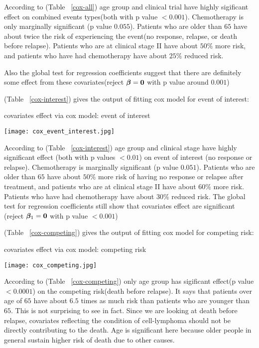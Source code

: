 \documentclass[times, doublespace]{simauth}
\begin{document}
According to (Table ~\ref{cox-all}) age group and clinical trial have highly sigificant effect on combined events types(both with p value $< 0.001$). Chemotherapy is only marginally significant (p value $0.055$). Patients who are older than $65$ have about twice the risk of experiencing the event(no response, relapse, or death before relapse). Patients who are at clinical stage II have about $50\%$ more risk, and patients who have had chemotherapy have about $25\%$ reduced risk. 

Also the global test for regression coefficients suggest that there are definitely some effect from these covariates(reject ${\bm \beta} = {\bf 0}$ with p value around $0.001$)

(Table ~\ref{cox-interest}) gives the output of fitting cox model for event of interest:
\begin{table}[!htb]
	\begin{center}
		\caption{covariates effect via cox model: event of interest}\label{cox-interest}
		\texttt{[image: cox\_event\_interest.jpg]}
	\end{center}
\end{table}

According to (Table ~\ref{cox-interest}) age group and clinical stage have highly significant effect (both with p values $<0.01 $) on event of interest (no response or relapse). Chemotherapy is marginally significant (p value $0.051$). Patients who are older than $65$ have about $50\%$ more risk of having no response or relapse after treatment, and patients who are at clinical stage II have about $60\%$ more risk. Patients who have had chemotherapy have about $30\%$ reduced risk.\vskip 2mm
The global test for regression coefficients still show that covariates effect are significant (reject ${\bm \beta}_1 = {\bf 0}$ with p value $<0.001$)

(Table ~\ref{cox-competing}) gives the output of fitting cox model for competing risk:
\begin{table}[!htb]
	\begin{center}
		\caption{covariates effect via cox model: competing risk}\label{cox-competing}
		\texttt{[image: cox\_competing.jpg]}
	\end{center}
\end{table}

According to (Table ~\ref{cox-competing}) only age group has sigificant effect(p value $<0.0001$) on the competing risk(death before relapse). It says that patients over age of $65$ have about $6.5$ times as much risk than patients who are younger than $65$.  This is not surprising to see in fact. Since we are looking at death before relapse, covariates reflecting the condition of cell-lymphoma should not be directly contributing to the death. Age is significant here because older people in general sustain higher risk of death due to other causes.
\end{document}
